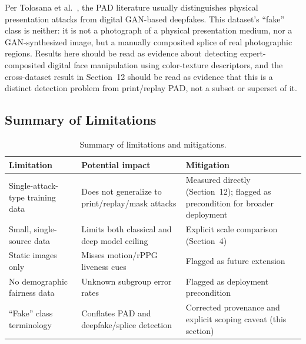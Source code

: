 \documentclass[11pt]{article}
\begin{document}
Per Tolosana et al.~\cite{tolosana2020}, the PAD literature usually distinguishes physical presentation attacks from digital GAN-based deepfakes. This dataset's ``fake'' class is neither: it is not a photograph of a physical presentation medium, nor a GAN-synthesized image, but a manually composited splice of real photographic regions. Results here should be read as evidence about detecting expert-composited digital face manipulation using color-texture descriptors, and the cross-dataset result in Section~12 should be read as evidence that this is a distinct detection problem from print/replay PAD, not a subset or superset of it.

\subsection{Summary of Limitations}

\begin{table}[htbp]
\centering
\caption{Summary of limitations and mitigations.}
\label{tab:limitations}
\small
\begin{tabular}{p{3.6cm}p{4.2cm}p{5.0cm}}
\toprule
Limitation & Potential impact & Mitigation \\
\midrule
Single-attack-type training data & Does not generalize to print/replay/mask attacks & Measured directly (Section~12); flagged as precondition for broader deployment \\
Small, single-source data & Limits both classical and deep model ceiling & Explicit scale comparison (Section~4) \\
Static images only & Misses motion/rPPG liveness cues & Flagged as future extension \\
No demographic fairness data & Unknown subgroup error rates & Flagged as deployment precondition \\
``Fake'' class terminology & Conflates PAD and deepfake/splice detection & Corrected provenance and explicit scoping caveat (this section) \\
\bottomrule
\end{tabular}
\end{table}
\end{document}
